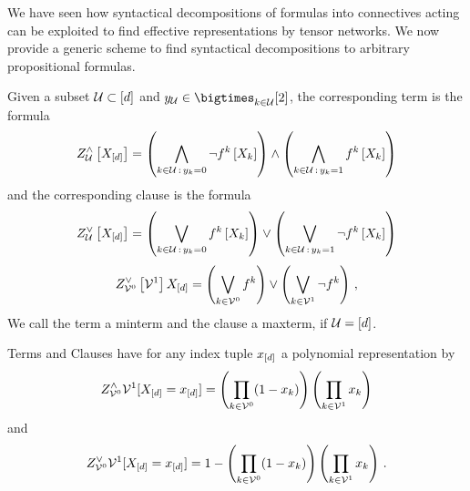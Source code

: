 We have seen how syntactical decompositions of formulas into connectives acting can be exploited to find effective representations by tensor networks.
We now provide a generic scheme to find syntactical decompositions to arbitrary propositional formulas.

\begin{definition}
    \label{def:clauses}
    Given a subset $\mathcal{U}\subset[d]$ and $\headindexof{\hardlegset}\in\bigtimes_{\catenumerator\in\hardlegset}[2]$, the corresponding term is the formula
    \begin{align*}
        Z^{\land}_{\mathcal{U}}\left[X_{[d]}\right]
        = \left(\bigwedge_{k\in\mathcal{U}\,:\,y_{k}=0}\lnot f^{k}\left[X_{k}\right]\right)
        \land
        \left(\bigwedge_{k\in\mathcal{U}\,:\,y_{k}=1}f^{k}\left[X_{k}\right]\right)
    \end{align*}
    and the corresponding clause is the formula
    \begin{align*}
        Z^{\lor}_{\mathcal{U}}\left[X_{[d]}\right]
        = \left(\bigvee_{k\in\mathcal{U}\,:\,y_{k}=0}f^{k}\left[X_{k}\right]\right)
        \lor
        \left(\bigvee_{k\in\mathcal{U}\,:\,y_{k}=1}\lnot f^{k}\left[X_{k}\right]\right)
    \end{align*}
    \begin{align*}
        Z^{\lor}_{\mathcal{V}^{0}}\left[\mathcal{V}^{1}\right]{X_{[d]}}
        =\left( \bigvee_{k\in\mathcal{V}^{0}} f^{k} \right)  \lor \left( \bigvee_{k\in\mathcal{V}^{1}} \lnot f^{k} \right)  \, ,
    \end{align*}
    We call the term a minterm and the clause a maxterm, if $\mathcal{U} = [d]$.
\end{definition}


Terms and Clauses have for any index tuple $x_{[d]}$ a polynomial representation by
\[ Z^{\land}_{\mathcal{V}^{0}}{\mathcal{V}^{1}}[X_{[d]}=x_{[d]}]
= \left( \prod_{k \in \mathcal{V}^{0}} (1-x_{k}) \right)
\left(  \prod_{k \in \mathcal{V}^{1}} x_{k} \right) \]
and
\[ Z^{\lor}_{\mathcal{V}^{0}}{\mathcal{V}^{1}}[X_{[d]}=x_{[d]}]
= 1 - \left( \prod_{k \in \mathcal{V}^{0}} (1-x_{k})\right)
\left(  \prod_{k \in \mathcal{V}^{1}} x_{k} \right) \, . \]


